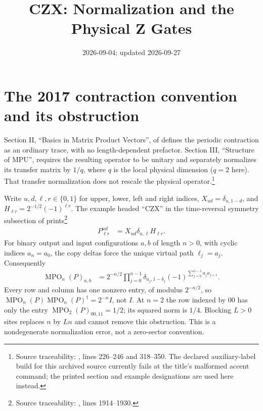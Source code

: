 \documentclass{article}
\title{CZX: Normalization and the Physical Z Gates}
\author{}
\date{2026-09-04; updated 2026-09-27}
\begin{document}
\maketitle
{}

\section{The 2017 contraction convention and its obstruction}
Section II, ``Basics in Matrix Product Vectors'', of
\cite{Cirac2017MPU} defines the periodic contraction as an ordinary trace,
with no length-dependent prefactor. Section III, ``Structure of MPU'',
requires the resulting operator to be unitary and separately normalizes
its transfer matrix by $1/q$, where $q$ is the local physical dimension
($q=2$ here). That transfer normalization does not rescale the physical
operator.\footnote{Source traceability: ,
    lines 226--246 and 318--350. The declared auxiliary-label build for this
    archived source currently fails at the title's malformed accent command;
    the printed section and example designations are used here instead.}

Write $u,d,\ell,r\in\{0,1\}$ for upper, lower, left and right indices,
$X_{ud}=\delta_{u,1-d}$, and $H_{\ell r}=2^{-1/2}(-1)^{\ell r}$.
The example headed ``CZX'' in the time-reversal symmetry subsection of
\cite{Cirac2017MPU} prints\footnote{Source traceability:
    , lines 1914--1930.}
\begin{align}
    P^{ud}_{\ell r} & =X_{ud}\delta_{u,\ell}H_{\ell r}.
    \label{eq:czx_printed_tensor}
\end{align}
For binary output and input configurations $a,b$ of length $n>0$, with
cyclic indices $a_n=a_0$, the copy deltas force the unique virtual path
$\ell_j=a_j$. Consequently
\begin{align}
    \operatorname{MPO}_n(P)_{a,b}
     & =2^{-n/2}\prod_{j=0}^{n-1}\delta_{a_j,1-b_j}
    (-1)^{\sum_{j=0}^{n-1}a_ja_{j+1}}.
    \label{eq:czx_periodic_contraction}
\end{align}
Every row and column has one nonzero entry, of modulus $2^{-n/2}$, so
$\operatorname{MPO}_n(P)\operatorname{MPO}_n(P)^\dagger=2^{-n}I$,
not $I$. At $n=2$ the row indexed by $00$ has only the entry
$\operatorname{MPO}_2(P)_{00,11}=1/2$; its squared norm is $1/4$.
Blocking $L>0$ sites replaces $n$ by $Ln$ and cannot remove this obstruction.
This is a nondegenerate normalization error, not a zero-sector convention.
\end{document}
